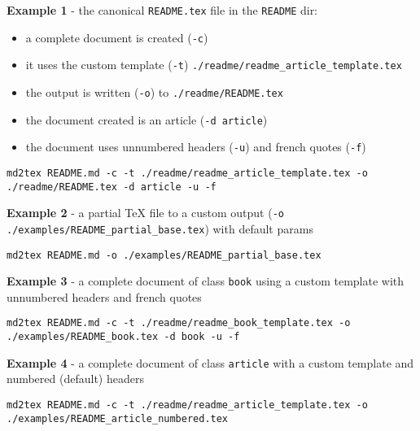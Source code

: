\documentclass[a4paper, 12pt, twoside]{article}
\begin{document}
\textbf{Example 1} - the canonical \texttt{README.tex} file in the \texttt{README} dir:

\begin{itemize}
\item a complete document is created (\texttt{-c})
\item it uses the custom template (\texttt{-t}) \texttt{./readme/readme\_article\_template.tex}
\item the output is written (\texttt{-o}) to \texttt{./readme/README.tex}
\item the document created is an article (\texttt{-d article})
\item the document uses unnumbered headers (\texttt{-u}) and french quotes (\texttt{-f}) 
\end{itemize}

\begin{listing}[h!]
   \begin{verbatim}
md2tex README.md -c -t ./readme/readme_article_template.tex -o ./readme/README.tex -d article -u -f

   \end{verbatim}
\end{listing}

\textbf{Example 2} - a partial TeX file to a custom output (\texttt{-o ./examples/README\_partial\_base.tex}) with default params

\begin{listing}[h!]
   \begin{verbatim}
md2tex README.md -o ./examples/README_partial_base.tex

   \end{verbatim}
\end{listing}

\textbf{Example 3} - a complete document of class \texttt{book} using a custom template with unnumbered headers and french quotes

\begin{listing}[h!]
   \begin{verbatim}
md2tex README.md -c -t ./readme/readme_book_template.tex -o ./examples/README_book.tex -d book -u -f

   \end{verbatim}
\end{listing}

\textbf{Example 4} - a complete document of class \texttt{article} with a custom template and numbered (default) headers

\begin{listing}[h!]
   \begin{verbatim}
md2tex README.md -c -t ./readme/readme_article_template.tex -o ./examples/README_article_numbered.tex

   \end{verbatim}
\end{listing}
\end{document}
